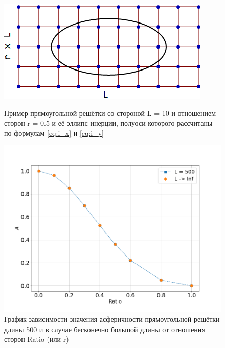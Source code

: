 \begin{figure}[h]
\begin{minipage}{0.45\textwidth}
     \includegraphics[width=\textwidth]{Sections/Images/RectanGrid.png}
    \caption{Пример прямоугольной решётки со стороной L = 10 и отношением сторон r = 0.5 и её эллипс инерции, полуоси которого рассчитаны по формулам \eqref{eq:i_x} и \eqref{eq:i_y}}
\end{minipage}
\hfill
\begin{minipage}{0.5\textwidth}
     \includegraphics[width=\textwidth]{Sections/Images/A_r.png}
    \caption{График зависимости значения асферичности прямоугольной решётки длины 500 и в случае бесконечно большой длины от отношения сторон Ratio (или r)}
    \label{fig:A_r}
\end{minipage}
   
\end{figure}

